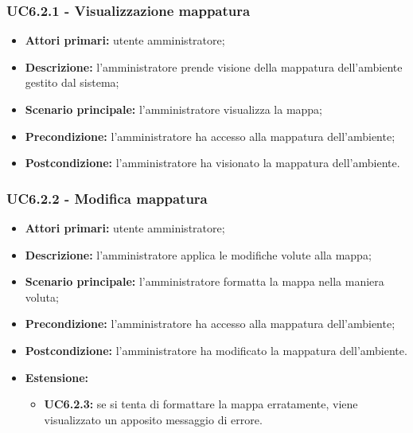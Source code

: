 	\subsubsection{UC6.2.1 - Visualizzazione mappatura}
	\begin{itemize}
		\item \textbf{Attori primari:} utente amministratore;
		\item \textbf{Descrizione:} l'amministratore prende visione della mappatura dell'ambiente gestito dal sistema;
		\item \textbf{Scenario principale:} l'amministratore visualizza la mappa;
		\item \textbf{Precondizione:} l'amministratore ha accesso alla mappatura dell'ambiente;
		\item \textbf{Postcondizione:} l'amministratore ha visionato la mappatura dell'ambiente.
	\end{itemize}

	\subsubsection{UC6.2.2 - Modifica mappatura}
	\begin{itemize}
		\item \textbf{Attori primari:} utente amministratore;
		\item \textbf{Descrizione:} l'amministratore applica le modifiche volute alla mappa;
		\item \textbf{Scenario principale:} l'amministratore formatta la mappa nella maniera voluta;		
		\item \textbf{Precondizione:} l'amministratore ha accesso alla mappatura dell'ambiente;
		\item \textbf{Postcondizione:} l'amministratore ha modificato la mappatura dell'ambiente.
		\item \textbf{Estensione:}
		\begin{itemize}
			\item \textbf{UC6.2.3:} se si tenta di formattare la mappa erratamente, viene visualizzato un apposito messaggio di errore.
		\end{itemize}
	\end{itemize}

